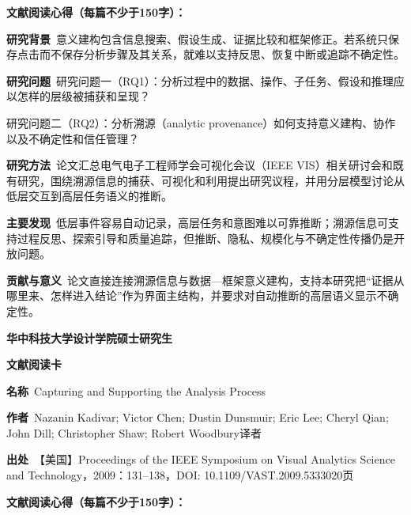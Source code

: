 \vspace{0.35em}
\noindent\textbf{文献阅读心得（每篇不少于150字）：}\par
\noindent\textbf{研究背景}\ 意义建构包含信息搜索、假设生成、证据比较和框架修正。若系统只保存点击而不保存分析步骤及其关系，就难以支持反思、恢复中断或追踪不确定性。\par
\noindent\textbf{研究问题}\ 研究问题一（RQ1）：分析过程中的数据、操作、子任务、假设和推理应以怎样的层级被捕获和呈现？\par
研究问题二（RQ2）：分析溯源（analytic provenance）如何支持意义建构、协作以及不确定性和信任管理？\par
\noindent\textbf{研究方法}\ 论文汇总电气电子工程师学会可视化会议（IEEE VIS）相关研讨会和既有研究，围绕溯源信息的捕获、可视化和利用提出研究议程，并用分层模型讨论从低层交互到高层任务语义的推断。\par
\noindent\textbf{主要发现}\ 低层事件容易自动记录，高层任务和意图难以可靠推断；溯源信息可支持过程反思、探索引导和质量追踪，但推断、隐私、规模化与不确定性传播仍是开放问题。\par
\noindent\textbf{贡献与意义}\ 论文直接连接溯源信息与数据—框架意义建构，支持本研究把“证据从哪里来、怎样进入结论”作为界面主结构，并要求对自动推断的高层语义显示不确定性。\par
\clearpage
\begin{center}
{\songti\bfseries\fontsize{18.5pt}{27.75pt}\selectfont 华中科技大学设计学院硕士研究生\par}
{\songti\bfseries\fontsize{18.5pt}{27.75pt}\selectfont 文献阅读卡\par}
\end{center}
\vspace{0.25em}
\noindent\underline{}\par
\vspace{0.35em}
\noindent\textbf{名称}\ Capturing and Supporting the Analysis Process\par
\noindent\textbf{作者}\ Nazanin Kadivar; Victor Chen; Dustin Dunsmuir; Eric Lee; Cheryl Qian; John Dill; Christopher Shaw; Robert Woodbury\quad 译者\par
\noindent\textbf{出处}\ 【美国】Proceedings of the IEEE Symposium on Visual Analytics Science and Technology，2009：131–138，DOI: 10.1109/VAST.2009.5333020\quad 页\par
\vspace{0.35em}
\noindent\textbf{文献阅读心得（每篇不少于150字）：}\par
